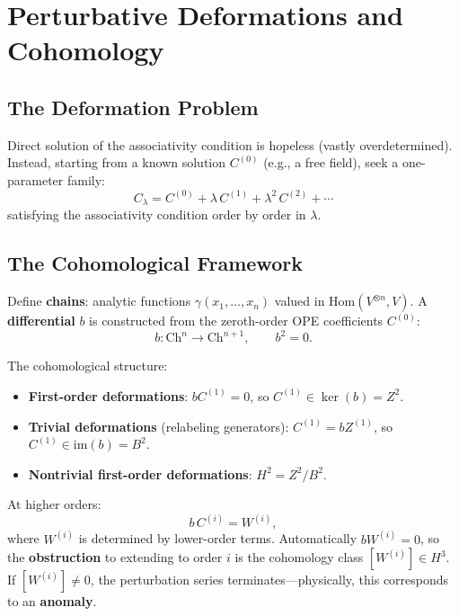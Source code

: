 \documentclass[11pt,a4paper]{article}
\begin{document}
\section{Perturbative Deformations and Cohomology}

\subsection{The Deformation Problem}

Direct solution of the associativity condition is hopeless (vastly
overdetermined). Instead, starting from a known solution
$C^{(0)}$ (e.g., a free field), seek a one-parameter family:
\begin{equation}
  C_\lambda = C^{(0)} + \lambda\, C^{(1)} + \lambda^2\, C^{(2)} + \cdots
\end{equation}
satisfying the associativity condition order by order in $\lambda$.

\subsection{The Cohomological Framework}

Define \textbf{chains}: analytic functions $\gamma(x_1,\ldots,x_n)$ valued
in $\mathrm{Hom}(V^{\otimes n}, V)$. A \textbf{differential} $b$ is
constructed from the zeroth-order OPE coefficients $C^{(0)}$:
\begin{equation}
  b: \mathrm{Ch}^n \longrightarrow \mathrm{Ch}^{n+1},
  \qquad b^2 = 0.
\end{equation}

The cohomological structure:
\begin{itemize}[nosep]
  \item \textbf{First-order deformations}: $bC^{(1)} = 0$, so
        $C^{(1)} \in \ker(b) = Z^2$.
  \item \textbf{Trivial deformations} (relabeling generators): $C^{(1)} = bZ^{(1)}$,
        so $C^{(1)} \in \mathrm{im}(b) = B^2$.
  \item \textbf{Nontrivial first-order deformations}: $H^2 = Z^2/B^2$.
\end{itemize}

At higher orders:
\begin{equation}
  b\, C^{(i)} = W^{(i)},
\end{equation}
where $W^{(i)}$ is determined by lower-order terms. Automatically
$bW^{(i)} = 0$, so the \textbf{obstruction} to extending to order $i$
is the cohomology class $[W^{(i)}] \in H^3$. If $[W^{(i)}] \neq 0$,
the perturbation series terminates---physically, this corresponds to
an \textbf{anomaly}.
\end{document}
